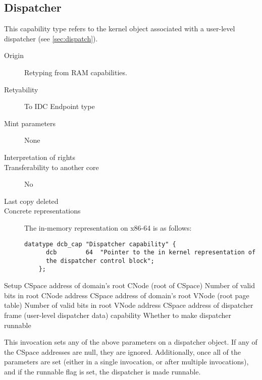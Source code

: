 \subsection{Dispatcher}
This capability type refers to the kernel object associated with a
user-level dispatcher (see \ref{sec:dispatch}).

\begin{description}
\item[Origin] Retyping from RAM capabilities.
  
\item[Retyability] To IDC Endpoint type
  
\item[Mint parameters] None
  
\item[Interpretation of rights] 
  
\item[Transferability to another core] No

\item[Last copy deleted] 
  
\item[Concrete representations] The in-memory representation on x86-64
  is as follows:
  
  \begin{lstlisting}[language=Mackerel]
    datatype dcb_cap "Dispatcher capability" {
      dcb        64  "Pointer to the in kernel representation of
      the dispatcher control block";
    };
  \end{lstlisting}
\end{description}

\begin{invocation}{Setup}
  \arg CSpace address of domain's root CNode (root of CSpace)
  \arg Number of valid bits in root CNode address
  \arg CSpace address of domain's root VNode (root page table)
  \arg Number of valid bits in root VNode address
  \arg CSpace address of dispatcher frame (user-level dispatcher
  data) capability
  \arg Whether to make dispatcher runnable
\end{invocation}
This invocation sets any of the above parameters on a dispatcher
object.  If any of the CSpace addresses are null, they are ignored.
Additionally, once all of the parameters are set (either in a single
invocation, or after multiple invocations), and if the runnable flag
is set, the dispatcher is made runnable.  

